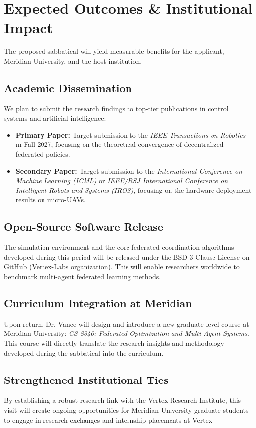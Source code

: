 \section{Expected Outcomes \& Institutional Impact}
The proposed sabbatical will yield measurable benefits for the applicant, Meridian University, and the host institution.

\subsection{Academic Dissemination}
We plan to submit the research findings to top-tier publications in control systems and artificial intelligence:
\begin{itemize}
    \item \textbf{Primary Paper:} Target submission to the \textit{IEEE Transactions on Robotics} in Fall 2027, focusing on the theoretical convergence of decentralized federated policies.
    \item \textbf{Secondary Paper:} Target submission to the \textit{International Conference on Machine Learning (ICML)} or \textit{IEEE/RSJ International Conference on Intelligent Robots and Systems (IROS)}, focusing on the hardware deployment results on micro-UAVs.
\end{itemize}

\subsection{Open-Source Software Release}
The simulation environment and the core federated coordination algorithms developed during this period will be released under the BSD 3-Clause License on GitHub (Vertex-Labs organization). This will enable researchers worldwide to benchmark multi-agent federated learning methods.

\subsection{Curriculum Integration at Meridian}
Upon return, Dr. Vance will design and introduce a new graduate-level course at Meridian University: \textit{CS 8840: Federated Optimization and Multi-Agent Systems}. This course will directly translate the research insights and methodology developed during the sabbatical into the curriculum.

\subsection{Strengthened Institutional Ties}
By establishing a robust research link with the Vertex Research Institute, this visit will create ongoing opportunities for Meridian University graduate students to engage in research exchanges and internship placements at Vertex.
